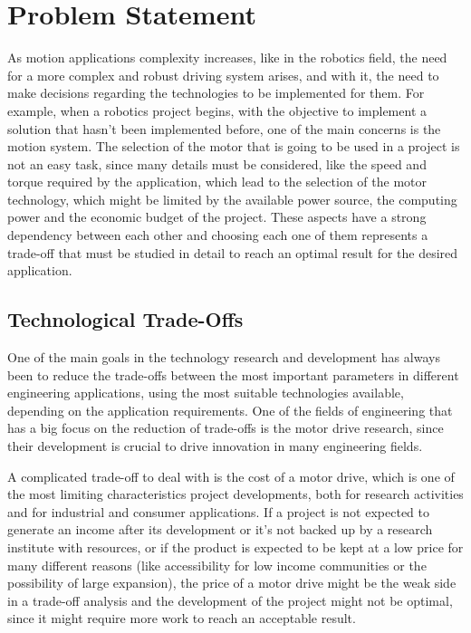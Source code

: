 \chapter{Problem Statement} \label{chap:problem}

As motion applications complexity increases, like in the robotics field, the need for a more complex and robust driving system arises, and with it, the need to make decisions regarding the technologies to be implemented for them. For example, when a robotics project begins, with the objective to implement a solution that hasn't been implemented before, one of the main concerns is the motion system. The selection of the motor that is going to be used in a project is not an easy task, since many details must be considered, like the speed and torque required by the application, which lead to the selection of the motor technology, which might be limited by the available power source, the computing power and the economic budget of the project. These aspects have a strong dependency between each other and choosing each one of them represents a trade-off that must be studied in detail to reach an optimal result for the desired application.

\section{Technological Trade-Offs}\label{sec:research_questions}

One of the main goals in the technology research and development has always been to reduce the trade-offs between the most important parameters in different engineering applications, using the most suitable technologies available, depending on the application requirements. One of the fields of engineering that has a big focus on the reduction of trade-offs is the motor drive research, since their development is crucial to drive innovation in many engineering fields.

A complicated trade-off to deal with is the cost of a motor drive, which is one of the most limiting characteristics project developments, both for research activities and for industrial and consumer applications. If a project is not expected to generate an income after its development or it’s not backed up by a research institute with resources, or if the product is expected to be kept at a low price for many different reasons (like accessibility for low income communities or the possibility of large expansion), the price of a motor drive might be the weak side in a trade-off analysis and the development of the project might not be optimal, since it might require more work to reach an acceptable result.


